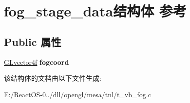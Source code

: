 \hypertarget{structfog__stage__data}{}\section{fog\+\_\+stage\+\_\+data结构体 参考}
\label{structfog__stage__data}
\subsection*{Public 属性}
\begin{DoxyCompactItemize}
\item 
\mbox{\label{structfog__stage__data_acb9d90d640329603f3e156811aff310e}} 
\hyperlink{struct_g_lvector4f}{G\+Lvector4f} {\bfseries fogcoord}
\end{DoxyCompactItemize}


该结构体的文档由以下文件生成\+:\begin{DoxyCompactItemize}
\item 
E\+:/\+React\+O\+S-\/0../dll/opengl/mesa/tnl/t\+\_\+vb\+\_\+fog.\+c\end{DoxyCompactItemize}
